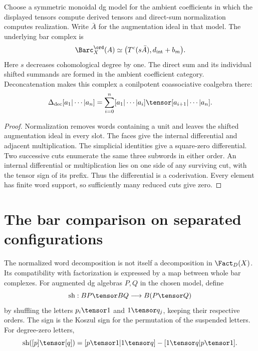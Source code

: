 \begin{theorem}
Choose a symmetric monoidal dg model for the ambient coefficients in which the displayed
tensors compute derived tensors and direct-sum normalization computes realization.
Write $\bar A$ for the augmentation ideal in that model.
The underlying bar complex is
\[
 \Barc_X^{\ord}(A)\simeq
 \bigl(T^c(s\bar A),d_{\mathrm{int}}+b_m\bigr).
\]
Here $s$ decreases cohomological degree by one.
The direct sum and its individual shifted summands are formed in the ambient coefficient category.
Deconcatenation makes this complex a conilpotent coassociative coalgebra there:
\[
 \Delta_{\mathrm{dec}}[a_1|\cdots|a_n]
 =\sum_{i=0}^n[a_1|\cdots|a_i]\tensor[a_{i+1}|\cdots|a_n].
\]
\end{theorem}
\begin{proof}
Normalization removes words containing a unit and leaves the shifted augmentation ideal in every slot.
The faces give the internal differential and adjacent multiplication.
The simplicial identities give a square-zero differential.
Two successive cuts enumerate the same three subwords in either order.
An internal differential or multiplication lies on one side of any surviving cut,
with the tensor sign of its prefix. Thus the differential is a coderivation.
Every element has finite word support, so sufficiently many reduced cuts give zero.
\end{proof}

\section{The bar comparison on separated configurations}
The normalized word decomposition is not itself a decomposition in $\Fact_D(X)$.
Its compatibility with factorization is expressed by a map between whole bar complexes.
For augmented dg algebras $P,Q$ in the chosen model, define
\[
 \operatorname{sh}:BP\tensor BQ\longrightarrow B(P\tensor Q)
\]
by shuffling the letters $p_i\tensor1$ and $1\tensor q_j$,
keeping their respective orders.
The sign is the Koszul sign for the permutation of the suspended letters.
For degree-zero letters,
\[
 \operatorname{sh}([p]\tensor[q])
 =[p\tensor1|1\tensor q]-[1\tensor q|p\tensor1].
\]

